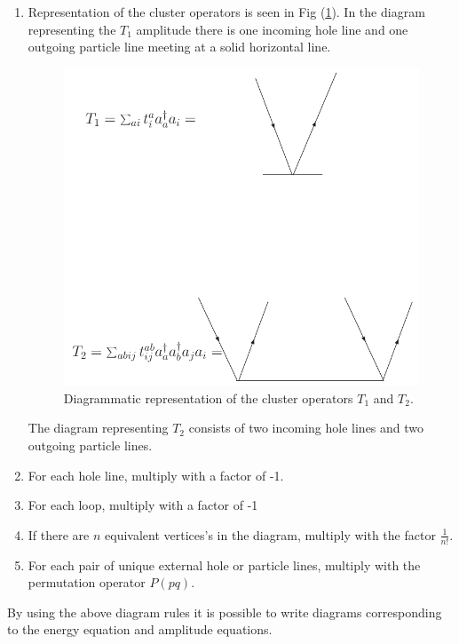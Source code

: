 \begin{enumerate}
\item Representation of the cluster operators is seen in 
Fig (\ref{clusterdi}). In the diagram representing the $T_1$ amplitude there
is one incoming hole line and one outgoing particle line meeting at a solid
horizontal line.


\begin{figure}[htp]
\centering
\includegraphics[scale=0.5]{clusterop}
\caption{Diagrammatic representation of the cluster operators $T_1$
and $T_2$.}
\label{clusterdi}
\end{figure}

The diagram representing $T_2$ consists of two incoming hole lines and two
outgoing particle lines. 


\item For each hole line, multiply with a factor of -1.

\item For each loop, multiply with a factor of -1

\item If there are $n$ equivalent vertices's in the diagram, multiply
with the factor $\frac{1}{n!}.$

\item For each pair of unique external hole or particle lines, multiply with
 the permutation operator $P(pq).$


\end{enumerate}

By using the above diagram rules it is possible to write diagrams
corresponding to the energy equation and amplitude equations. 

